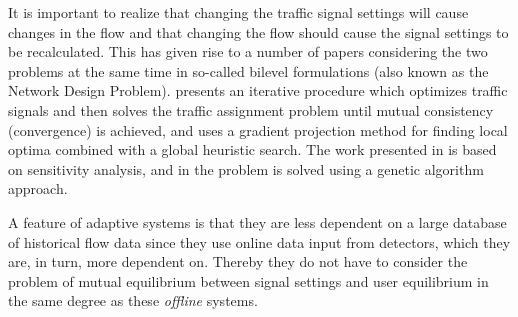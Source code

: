 It is important to realize that changing the traffic signal settings
will cause changes in the flow and that changing the flow should cause
the signal settings to be recalculated. This has given rise to a
number of papers considering the two problems at the same time in
so-called bilevel formulations (also known as the Network Design
Problem). \cite{mc} presents an iterative procedure which optimizes
traffic signals and then solves the traffic assignment problem until
mutual consistency (convergence) is achieved, and \cite{34} uses a
gradient projection method for finding local optima combined with a
global heuristic search. The work presented in \cite{20} is based on
sensitivity analysis, and in \cite{2,27} the problem is solved using a
genetic algorithm approach.

A feature of adaptive systems is that they are less dependent on a
large database of historical flow data since they use online data
input from detectors, which they are, in turn, more dependent
on. Thereby they do not have to consider the problem of mutual
equilibrium between signal settings and user equilibrium in the same
degree as these \textit{offline} systems.
